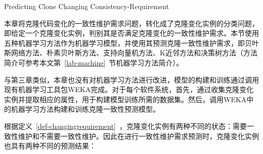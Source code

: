 
{Predicting Clone Changing Consistency-Requirement} 

本章将克隆代码变化的一致性维护需求问题，转化成了克隆变化实例的分类问题，即给定一个克隆变化实例，判别其是否满足克隆变化的一致性维护需求。本节使用五种机器学习方法作为机器学习模型，并使用其预测克隆一致性维护需求，即贝叶斯网络方法、朴素贝叶斯方法、支持向量机方法、K近邻方法和决策树方法（方法简介可参考本文第~\ref{lab-machine}~节机器学习方法简介）。

与第三章类似，本章也没有对机器学习方法进行改进，模型的构建和训练通过调用现有机器学习工具包WEKA完成。对于每个软件系统，首先，通过收集克隆变化实例并提取相应的属性，用于构建模型训练所需的数据集。然后，调用WEKA中的机器学习方法构建和训练克隆一致性预测模型。

根据定义~\ref{def-changingrequirement}~，克隆变化实例有两种不同的状态：需要一致性维护和不需要一致性维护。因此在进行一致性维护需求预测时，克隆变化实例也具有两种不同的预测结果：

